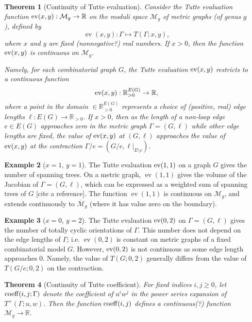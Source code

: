 \documentclass{amsart}
\newtheorem{thm}{Theorem}
\theoremstyle{definition}
\newtheorem{eg}[thm]{Example}
\newcommand{\RR}{\mathbb{R}}
\DeclareMathOperator{\ev}{ev}
\begin{document}
\begin{thm}[Continuity of Tutte evaluation]
Consider the Tutte evaluation function %
${\rm ev}(x,y) : \mathcal M_g \to \RR$ 
on the moduli space 
$\mathcal M_g$ of metric graphs (of genus $g$),
defined by
$$ \ev(x,y) : \Gamma \mapsto T(\Gamma; x,y) ,$$
where  $x$ and $y$ are fixed (nonnegative?) real numbers.
If $x > 0$, 
then the function ${\rm ev}(x,y)$ is continuous on $\mathcal M_g$.

Namely, for each combinatorial graph $G$,
the Tutte evaluation 
${\rm ev}(x,y) $ 
restricts to a continuous function
$$ {\rm ev}(x,y) : \RR_{>0}^{E(G)} \to \RR,$$ 
where a point in the domain $ \in \RR_{>0}^{E(G)}$
represents a choice of (positive, real) edge lengths  $\ell : E(G) \to \RR_{>0}$.
If $x>0$, then as the length of a  non-loop edge $e \in E(G)$ approaches zero
in the metric graph $\Gamma = (G,\ell)$
while other edge lengths are fixed,
the value of 
${\rm ev}(x,y)$
at $(G,\ell)$ %
approaches the value of ${\rm ev}(x,y)$ at the contraction 
$\Gamma / e = (G / e, \ell \big|_{E\setminus e})$.
\end{thm}

\begin{eg}
[$x = 1$, $y=1$]
The Tutte evaluation ${\rm ev}(1,1)$ 
on a graph $G$ gives the number of spanning trees.
On a metric graph, $\ev(1,1)$ gives the volume of the Jacobian of
$\Gamma = (G,\ell)$,
which can be expressed as a weighted sum of spanning trees of $G$ [cite a reference].
The function $\ev(1,1)$ is continuous on $\mathcal M_g$, 
and extends continuously to $\overline{\mathcal M}_g$ 
(where it has value zero on the boundary).
\end{eg}
\begin{eg}
[$x = 0$, $y=2$]
The Tutte evaluation ${\rm ev}(0,2)$ 
on $\Gamma = (G,\ell)$ gives the number of totally cyclic orientations of $\Gamma$.
This number does not depend on the edge lengths of $\Gamma$;
i.e. $\ev(0,2)$
 is constant on metric graphs %
of a fixed combinatorial model $G$.
However, ${\rm ev}(0,2)$ is not continuous as some edge length approaches $0$.
Namely, the value of $T(G; 0, 2)$ generally differs from the value of $T(G/e; 0,2)$
on the contraction.
\end{eg}

\begin{thm}[Continuity of Tutte coefficient]
For fixed indices $i,j\geq 0$,
let ${\rm coeff}(i,j; \Gamma)$
denote the coefficient of $u^i w^j$ in the power series expansion of $T^+(\Gamma; u,w)$.
Then the function ${\rm coeff}(i,j)$
defines a continuous(?) 
function $\mathcal M_g \to \RR$.
\end{thm}
\end{document}

